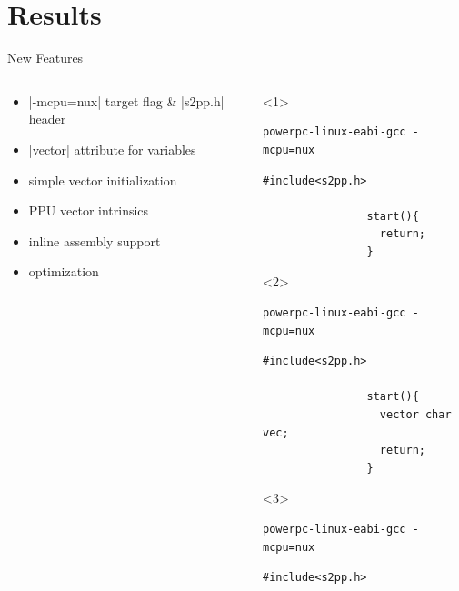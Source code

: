 \documentclass[10pt,aspectratio=169]{beamer}
\begin{document}
\section{Results}
\begin{frame}[fragile]{New Features}
    \begin{columns}[t]
    \begin{column}{0.5\textwidth}
		\vspace*{2em}
		\begin{itemize}[<+->]
			\setlength\itemsep{1em}
			\item |-mcpu=nux| target flag \& |s2pp.h| header
			\item |vector| attribute for variables
			\item simple vector initialization
			\item PPU vector intrinsics
			\item inline assembly support
			\item optimization
        \end{itemize}
		\vspace*{2em}
    \end{column}

	\begin{column}[t]{0.5\textwidth}
        \centering
		\begin{onlyenv}<1>
				\begin{lstlisting}[title=Compile command]
powerpc-linux-eabi-gcc -mcpu=nux
				\end{lstlisting}
				
				\begin{lstlisting}[title=Example file]
				#include<s2pp.h>
				
				start(){
				  return;
				}
				\end{lstlisting}
	\end{onlyenv}
		\begin{onlyenv}<2>
				\begin{lstlisting}[title=Compile command]
powerpc-linux-eabi-gcc -mcpu=nux
				\end{lstlisting}
				\begin{lstlisting}[title=Example file]
				#include<s2pp.h>

				start(){
				  vector char vec;
				  return;
				}
				\end{lstlisting}
	\end{onlyenv}
		\begin{onlyenv}<3>
				\begin{lstlisting}[title=Compile command]
powerpc-linux-eabi-gcc -mcpu=nux
				\end{lstlisting}
				\begin{lstlisting}[title=Example file]
				#include<s2pp.h>


\end{lstlisting}
\end{onlyenv}
\end{column}
\end{columns}
\end{frame}
\end{document}
